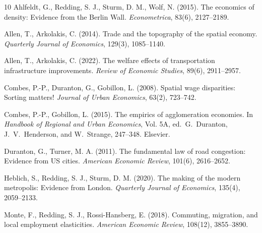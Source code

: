 \documentclass[12pt]{article}
\begin{document}
\begin{thebibliography}{10}
Ahlfeldt, G., Redding, S. J., Sturm, D. M., Wolf, N. (2015). The
economics of density: Evidence from the Berlin Wall.
\emph{Econometrica}, 83(6), 2127--2189.

Allen, T., Arkolakis, C. (2014). Trade and the topography of the
spatial economy. \emph{Quarterly Journal of Economics}, 129(3),
1085--1140.

Allen, T., Arkolakis, C. (2022). The welfare effects of transportation
infrastructure improvements. \emph{Review of Economic Studies},
89(6), 2911--2957.

Combes, P.-P., Duranton, G., Gobillon, L. (2008). Spatial wage
disparities: Sorting matters! \emph{Journal of Urban Economics},
63(2), 723--742.

Combes, P.-P., Gobillon, L. (2015). The empirics of agglomeration
economies. In \emph{Handbook of Regional and Urban Economics}, Vol.
5A, ed.\ G.\ Duranton, J.\ V.\ Henderson, and W.\ Strange, 247--348.
Elsevier.

Duranton, G., Turner, M. A. (2011). The fundamental law of road
congestion: Evidence from US cities. \emph{American Economic Review},
101(6), 2616--2652.

Heblich, S., Redding, S. J., Sturm, D. M. (2020). The making of the
modern metropolis: Evidence from London. \emph{Quarterly Journal of
Economics}, 135(4), 2059--2133.

Monte, F., Redding, S. J., Rossi-Hansberg, E. (2018). Commuting,
migration, and local employment elasticities. \emph{American Economic
Review}, 108(12), 3855--3890.

\end{thebibliography}
\end{document}

